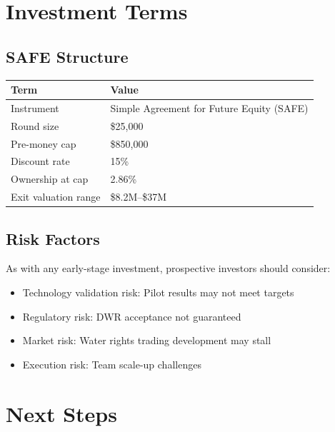 \documentclass[10pt]{article}
\begin{document}
\newpage

\section{Investment Terms}

\subsection{SAFE Structure}

\begin{table}[h]
\centering
\begin{tabular}{@{}ll@{}}
\toprule
\textbf{Term} & \textbf{Value} \\
\midrule
Instrument & Simple Agreement for Future Equity (SAFE) \\
Round size & \$25,000 \\
Pre-money cap & \$850,000 \\
Discount rate & 15\% \\
Ownership at cap & 2.86\% \\
Exit valuation range & \$8.2M–\$37M \\
\bottomrule
\end{tabular}
\end{table}

\subsection{Risk Factors}

As with any early-stage investment, prospective investors should consider:

\begin{itemize}
    \item Technology validation risk: Pilot results may not meet targets
    \item Regulatory risk: DWR acceptance not guaranteed
    \item Market risk: Water rights trading development may stall
    \item Execution risk: Team scale-up challenges
\end{itemize}

\newpage

\section{Next Steps}
\end{document}
